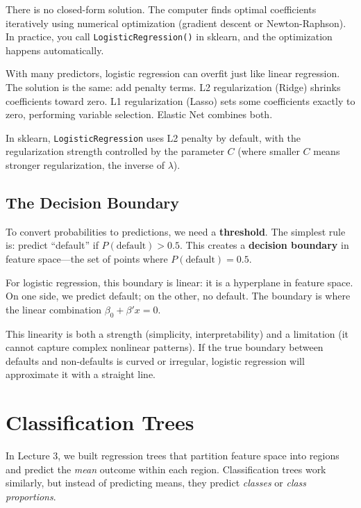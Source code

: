 \documentclass[11pt,a4paper]{article}
\newcommand{\keyword}[1]{\textbf{\textcolor{AccentOrange}{#1}}}
\begin{document}
There is no closed-form solution. The computer finds optimal coefficients iteratively using numerical optimization (gradient descent or Newton-Raphson). In practice, you call \texttt{LogisticRegression()} in sklearn, and the optimization happens automatically.

With many predictors, logistic regression can overfit just like linear regression. The solution is the same: add penalty terms. L2 regularization (Ridge) shrinks coefficients toward zero. L1 regularization (Lasso) sets some coefficients exactly to zero, performing variable selection. Elastic Net combines both.

In sklearn, \texttt{LogisticRegression} uses L2 penalty by default, with the regularization strength controlled by the parameter $C$ (where smaller $C$ means stronger regularization, the inverse of $\lambda$).

\subsection{The Decision Boundary}

To convert probabilities to predictions, we need a \keyword{threshold}. The simplest rule is: predict ``default'' if $P(\text{default}) > 0.5$. This creates a \keyword{decision boundary} in feature space---the set of points where $P(\text{default}) = 0.5$.

For logistic regression, this boundary is linear: it is a hyperplane in feature space. On one side, we predict default; on the other, no default. The boundary is where the linear combination $\beta_0 + \beta' x = 0$.

This linearity is both a strength (simplicity, interpretability) and a limitation (it cannot capture complex nonlinear patterns). If the true boundary between defaults and non-defaults is curved or irregular, logistic regression will approximate it with a straight line.

\section{Classification Trees}
In Lecture 3, we built regression trees that partition feature space into regions and predict the \emph{mean} outcome within each region. Classification trees work similarly, but instead of predicting means, they predict \emph{classes} or \emph{class proportions}.
\end{document}
